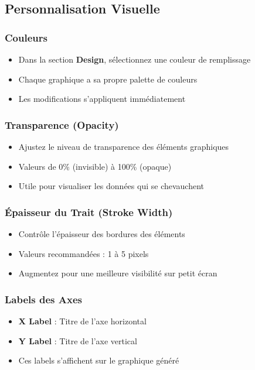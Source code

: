 \documentclass[11pt, a4paper]{article}
\begin{document}
\subsection{Personnalisation Visuelle}

\subsubsection{Couleurs}
\begin{itemize}
    \item Dans la section \textbf{Design}, sélectionnez une couleur de remplissage
    \item Chaque graphique a sa propre palette de couleurs
    \item Les modifications s'appliquent immédiatement
\end{itemize}

\subsubsection{Transparence (Opacity)}
\begin{itemize}
    \item Ajustez le niveau de transparence des éléments graphiques
    \item Valeurs de 0\% (invisible) à 100\% (opaque)
    \item Utile pour visualiser les données qui se chevauchent
\end{itemize}

\subsubsection{Épaisseur du Trait (Stroke Width)}
\begin{itemize}
    \item Contrôle l'épaisseur des bordures des éléments
    \item Valeurs recommandées : 1 à 5 pixels
    \item Augmentez pour une meilleure visibilité sur petit écran
\end{itemize}

\subsubsection{Labels des Axes}
\begin{itemize}
    \item \textbf{X Label} : Titre de l'axe horizontal
    \item \textbf{Y Label} : Titre de l'axe vertical
    \item Ces labels s'affichent sur le graphique généré
\end{itemize}
\end{document}
